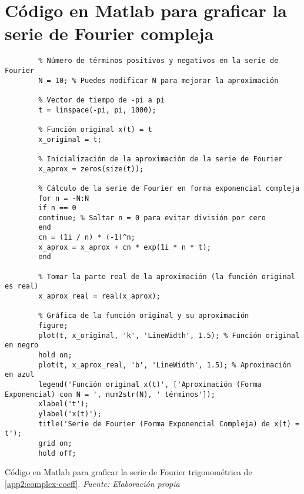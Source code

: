 \section{Código en Matlab para graficar la serie de Fourier compleja}\label{app3:complex-code-matlab}
\begin{longlisting}
	\begin{verbatim}
		% Número de términos positivos y negativos en la serie de Fourier
		N = 10; % Puedes modificar N para mejorar la aproximación
		
		% Vector de tiempo de -pi a pi
		t = linspace(-pi, pi, 1000);
		
		% Función original x(t) = t
		x_original = t;
		
		% Inicialización de la aproximación de la serie de Fourier
		x_aprox = zeros(size(t));
		
		% Cálculo de la serie de Fourier en forma exponencial compleja
		for n = -N:N
		if n == 0
		continue; % Saltar n = 0 para evitar división por cero
		end
		cn = (1i / n) * (-1)^n;
		x_aprox = x_aprox + cn * exp(1i * n * t);
		end
		
		% Tomar la parte real de la aproximación (la función original es real)
		x_aprox_real = real(x_aprox);
		
		% Gráfica de la función original y su aproximación
		figure;
		plot(t, x_original, 'k', 'LineWidth', 1.5); % Función original en negro
		hold on;
		plot(t, x_aprox_real, 'b', 'LineWidth', 1.5); % Aproximación en azul
		legend('Función original x(t)', ['Aproximación (Forma Exponencial) con N = ', num2str(N), ' términos']);
		xlabel('t');
		ylabel('x(t)');
		title('Serie de Fourier (Forma Exponencial Compleja) de x(t) = t');
		grid on;
		hold off;	
	\end{verbatim}
	\caption[Código en Matlab para graficar la serie de Fourier compleja de \ref{app2:complex-coeff}.] {Código en Matlab para graficar la serie de Fourier trigonométrica de \ref{app2:complex-coeff}. \textit{Fuente: Elaboración propia}} 
\end{longlisting}

